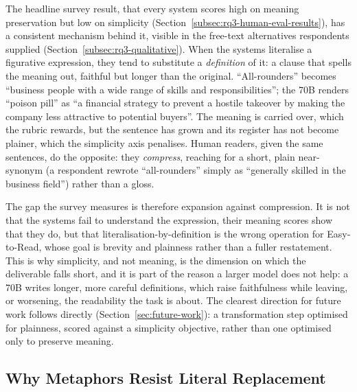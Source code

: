 The headline survey result, that every system scores high on meaning preservation but low on simplicity (Section~\ref{subsec:rq3-human-eval-results}), has a consistent mechanism behind it, visible in the free-text alternatives respondents supplied (Section~\ref{subsec:rq3-qualitative}). When the systems literalise a figurative expression, they tend to substitute a \textit{definition} of it: a clause that spells the meaning out, faithful but longer than the original. ``All-rounders'' becomes ``business people with a wide range of skills and responsibilities''; the 70B renders ``poison pill'' as ``a financial strategy to prevent a hostile takeover by making the company less attractive to potential buyers''. The meaning is carried over, which the rubric rewards, but the sentence has grown and its register has not become plainer, which the simplicity axis penalises. Human readers, given the same sentences, do the opposite: they \textit{compress}, reaching for a short, plain near-synonym (a respondent rewrote ``all-rounders'' simply as ``generally skilled in the business field'') rather than a gloss.

The gap the survey measures is therefore expansion against compression. It is not that the systems fail to understand the expression, their meaning scores show that they do, but that literalisation-by-definition is the wrong operation for Easy-to-Read, whose goal is brevity and plainness rather than a fuller restatement. This is why simplicity, and not meaning, is the dimension on which the deliverable falls short, and it is part of the reason a larger model does not help: a 70B writes longer, more careful definitions, which raise faithfulness while leaving, or worsening, the readability the task is about. The clearest direction for future work follows directly (Section~\ref{sec:future-work}): a transformation step optimised for plainness, scored against a simplicity objective, rather than one optimised only to preserve meaning.

\subsection{Why Metaphors Resist Literal Replacement}



